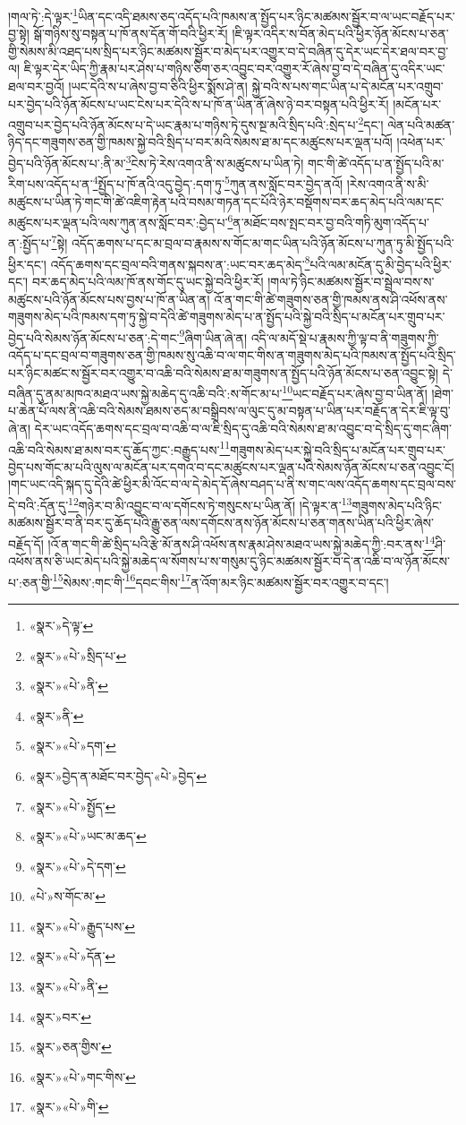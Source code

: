 །གལ་ཏེ་:དེ་ལྟར་\footnote{«སྣར་»དེ་ལྟ་}ཡིན་དང་འདི་ཐམས་ཅད་འདོད་པའི་ཁམས་ན་སྤྱོད་པར་ཉིང་མཚམས་སྦྱོར་བ་ལ་ཡང་བརྗོད་པར་བྱ་སྟེ། སྒོ་གཉིས་སུ་བསྟན་པ་ཁོ་ནས་དོན་གོ་བའི་ཕྱིར་རོ། །ཇི་ལྟར་འདིར་ས་བོན་མེད་པའི་ཕྱིར་ཉོན་མོངས་པ་ཅན་གྱི་སེམས་མི་འཐད་པས་སྲིད་པར་ཉིང་མཚམས་སྦྱོར་བ་མེད་པར་འགྱུར་བ་དེ་བཞིན་དུ་དེར་ཡང་དེར་ཐལ་བར་བྱ་ལ། ཇི་ལྟར་དེར་ཡིད་ཀྱི་རྣམ་པར་ཤེས་པ་གཉིས་ཅིག་ཅར་འབྱུང་བར་འགྱུར་རོ་ཞེས་བྱ་བ་དེ་བཞིན་དུ་འདིར་ཡང་ཐལ་བར་བྱའོ། །ཡང་དེའི་ས་པ་ཞེས་བྱ་བ་ཅིའི་ཕྱིར་སྨོས་ཤེ་ན། སྐྱེ་བའི་ས་པས་གང་ཡིན་པ་དེ་མངོན་པར་འགྲུབ་པར་བྱེད་པའི་ཉོན་མོངས་པ་ཡང་ངེས་པར་དེའི་ས་པ་ཁོ་ན་ཡིན་ནོ་ཞེས་ཉེ་བར་བསྟན་པའི་ཕྱིར་རོ། །མངོན་པར་འགྲུབ་པར་བྱེད་པའི་ཉོན་མོངས་པ་དེ་ཡང་རྣམ་པ་གཉིས་ཏེ་དུས་སྔ་མའི་སྲིད་པའི་:སྲེད་པ་\footnote{«སྣར་»«པེ་»སྲིད་པ་}དང་། ལེན་པའི་མཚན་ཉིད་དང་གཟུགས་ཅན་གྱི་ཁམས་སྐྱེ་བའི་སྲིད་པ་བར་མའི་སེམས་ཐ་མ་དང་མཚུངས་པར་ལྡན་པའོ། །འཕེན་པར་བྱེད་པའི་ཉོན་མོངས་པ་:ནི་མ་\footnote{«སྣར་»«པེ་»ནི་}ངེས་ཏེ་རེས་འགའ་ནི་ས་མཚུངས་པ་ཡིན་ཏེ། གང་གི་ཚེ་འདོད་པ་ན་སྤྱོད་པའི་མ་རིག་པས་འདོད་པ་ན་\footnote{«སྣར་»ནི་}སྤྱོད་པ་ཁོ་ནའི་འདུ་བྱེད་:དག་ཏུ་\footnote{«སྣར་»«པེ་»དག་}ཀུན་ནས་སློང་བར་བྱེད་ནའོ། །རེས་འགའ་ནི་ས་མི་མཚུངས་པ་ཡིན་ཏེ་གང་གི་ཚེ་འཇིག་རྟེན་པའི་བསམ་གཏན་དང་པོའི་ཉེར་བསྡོགས་བར་ཆད་མེད་པའི་ལམ་དང་མཚུངས་པར་ལྡན་པའི་ལས་ཀུན་ནས་སློང་བར་:བྱེད་པ་\footnote{«སྣར་»བྱེད་ན་མཐོང་བར་བྱེད་«པེ་»བྱེད་}ན་མཐོང་བས་སྤང་བར་བྱ་བའི་གཏི་མུག་འདོད་པ་ན་:སྤྱོད་པ་\footnote{«སྣར་»«པེ་»སྤྱོད་}སྟེ། འདོད་ཆགས་པ་དང་མ་བྲལ་བ་རྣམས་ས་གོང་མ་གང་ཡིན་པའི་ཉོན་མོངས་པ་ཀུན་ཏུ་མི་སྤྱོད་པའི་ཕྱིར་དང་། འདོད་ཆགས་དང་བྲལ་བའི་གནས་སྐབས་ན་:ཡང་བར་ཆད་མེད་\footnote{«སྣར་»«པེ་»ཡང་མ་ཆད་}པའི་ལམ་མངོན་དུ་མི་བྱེད་པའི་ཕྱིར་དང་། བར་ཆད་མེད་པའི་ལམ་ཁོ་ནས་གོང་དུ་ཡང་སྐྱེ་བའི་ཕྱིར་རོ། །གལ་ཏེ་ཉིང་མཚམས་སྦྱོར་བ་སྦྲེལ་བས་ས་མཚུངས་པའི་ཉོན་མོངས་པས་བྱས་པ་ཁོ་ན་ཡིན་ན། འོ་ན་གང་གི་ཚེ་གཟུགས་ཅན་གྱི་ཁམས་ནས་ཤི་འཕོས་ནས་གཟུགས་མེད་པའི་ཁམས་དག་ཏུ་སྐྱེ་བ་དེའི་ཚེ་གཟུགས་མེད་པ་ན་སྤྱོད་པའི་སྐྱེ་བའི་སྲིད་པ་མངོན་པར་གྲུབ་པར་བྱེད་པའི་སེམས་ཉོན་མོངས་པ་ཅན་:དེ་གང་\footnote{«སྣར་»«པེ་»དེ་དག་}ཞིག་ཡིན་ཞེ་ན། འདི་ལ་མདོ་སྡེ་པ་རྣམས་ཀྱི་ལྟ་བ་ནི་གཟུགས་ཀྱི་འདོད་པ་དང་བྲལ་བ་གཟུགས་ཅན་གྱི་ཁམས་སུ་འཆི་བ་ལ་གང་གིས་ན་གཟུགས་མེད་པའི་ཁམས་ན་སྤྱོད་པའི་སྲིད་པར་ཉིང་མཚང་ས་སྦྱོར་བར་འགྱུར་བ་འཆི་བའི་སེམས་ཐ་མ་གཟུགས་ན་སྤྱོད་པའི་ཉོན་མོངས་པ་ཅན་འབྱུང་སྟེ། དེ་བཞིན་དུ་ནམ་མཁའ་མཐའ་ཡས་སྐྱེ་མཆེད་དུ་འཆི་བའི་:ས་གོང་མ་པ་\footnote{«པེ་»ས་གོང་མ་}ཡང་བརྗོད་པར་ཞེས་བྱ་བ་ཡིན་ནོ། །ཐེག་པ་ཆེན་པོ་ལས་ནི་འཆི་བའི་སེམས་ཐམས་ཅད་མ་བསྒྲིབས་ལ་ལུང་དུ་མ་བསྟན་པ་ཡིན་པར་བརྗོད་ན་དེར་ཇི་ལྟ་བུ་ཞེ་ན། དེར་ཡང་འདོད་ཆགས་དང་བྲལ་བ་འཆི་བ་ལ་ཇི་སྲིད་དུ་འཆི་བའི་སེམས་ཐ་མ་འབྱུང་བ་དེ་སྲིད་དུ་གང་ཞིག་འཆི་བའི་སེམས་ཐ་མས་བར་དུ་ཆོད་ཀྱང་:བརྒྱུད་པས་\footnote{«སྣར་»«པེ་»རྒྱུད་པས་}གཟུགས་མེད་པར་སྐྱེ་བའི་སྲིད་པ་མངོན་པར་གྲུབ་པར་བྱེད་པས་གོང་མ་པའི་ལུས་ལ་མངོན་པར་དགའ་བ་དང་མཚུངས་པར་ལྡན་པའི་སེམས་ཉོན་མོངས་པ་ཅན་འབྱུང་ངོ། །གང་ཡང་འདི་སྐད་དུ་དེའི་ཚེ་ཕྱིར་མི་འོང་བ་ལ་དེ་མེད་དོ་ཞེས་བཤད་པ་ནི་ས་གང་ལས་འདོད་ཆགས་དང་བྲལ་བས་དེ་བའི་:དོན་དུ་\footnote{«སྣར་»«པེ་»དོན་}གཉེར་བ་མི་འབྱུང་བ་ལ་དགོངས་ཏེ་གསུངས་པ་ཡིན་ནོ། །དེ་ལྟར་ན་\footnote{«སྣར་»«པེ་»ནི་}གཟུགས་མེད་པའི་ཉིང་མཚམས་སྦྱོར་བ་ནི་བར་དུ་ཆོད་པའི་རྒྱུ་ཅན་ལས་དགོངས་ནས་ཉོན་མོངས་པ་ཅན་གནས་ཡིན་པའི་ཕྱིར་ཞེས་བརྗོད་དོ། །འོ་ན་གང་གི་ཚེ་སྲིད་པའི་རྩེ་མོ་ནས་ཤི་འཕོས་ནས་རྣམ་ཤེས་མཐའ་ཡས་སྐྱེ་མཆེད་ཀྱི་:བར་ནས་\footnote{«སྣར་»བར་}ཤི་འཕོས་ནས་ཅི་ཡང་མེད་པའི་སྐྱེ་མཆེད་ལ་སོགས་པ་ས་གསུམ་དུ་ཉིང་མཚམས་སྦྱོར་བ་དེ་ན་འཆི་བ་ལ་ཉོན་མོངས་པ་:ཅན་གྱི་\footnote{«སྣར་»ཅན་གྱིས་}སེམས་:གང་གི་\footnote{«སྣར་»«པེ་»གང་གིས་}དབང་གིས་\footnote{«སྣར་»«པེ་»གི་}ན་འོག་མར་ཉིང་མཚམས་སྦྱོར་བར་འགྱུར་བ་དང་། 
